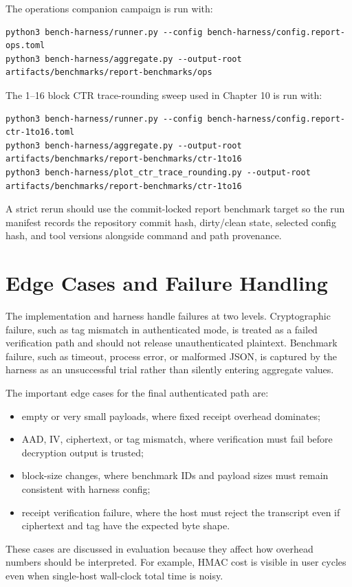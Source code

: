 The operations companion campaign is run with:

\begin{verbatim}
python3 bench-harness/runner.py --config bench-harness/config.report-ops.toml
python3 bench-harness/aggregate.py --output-root artifacts/benchmarks/report-benchmarks/ops
\end{verbatim}

The 1--16 block CTR trace-rounding sweep used in Chapter 10 is run with:

\begin{verbatim}
python3 bench-harness/runner.py --config bench-harness/config.report-ctr-1to16.toml
python3 bench-harness/aggregate.py --output-root artifacts/benchmarks/report-benchmarks/ctr-1to16
python3 bench-harness/plot_ctr_trace_rounding.py --output-root artifacts/benchmarks/report-benchmarks/ctr-1to16
\end{verbatim}

A strict rerun should use the commit-locked report benchmark target so the run
manifest records the repository commit hash, dirty/clean state, selected config
hash, and tool versions alongside command and path provenance.

\section{Edge Cases and Failure Handling}

The implementation and harness handle failures at two levels. Cryptographic
failure, such as tag mismatch in authenticated mode, is treated as a failed
verification path and should not release unauthenticated plaintext. Benchmark
failure, such as timeout, process error, or malformed JSON, is captured by the
harness as an unsuccessful trial rather than silently entering aggregate values.

The important edge cases for the final authenticated path are:

\begin{itemize}
\item empty or very small payloads, where fixed receipt overhead dominates;
\item AAD, IV, ciphertext, or tag mismatch, where verification must fail before
decryption output is trusted;
\item block-size changes, where benchmark IDs and payload sizes must remain
consistent with harness config;
\item receipt verification failure, where the host must reject the transcript
even if ciphertext and tag have the expected byte shape.
\end{itemize}

These cases are discussed in evaluation because they affect how overhead numbers
should be interpreted. For example, HMAC cost is visible in user cycles even when
single-host wall-clock total time is noisy.
